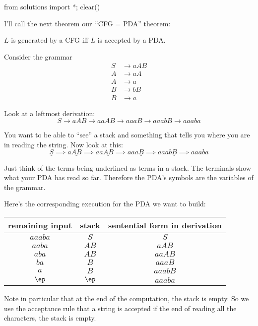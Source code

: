 \begin{python0}
from solutions import *; clear()
\end{python0}

I'll call the next theorem our \lq\lq CFG = PDA'' theorem:
\begin{thm}
 $L$ is generated by a CFG iff $L$ is accepted by a PDA.
\end{thm}

\begin{eg}
 Consider the grammar
 \begin{align*}
  S &\rightarrow aAB \\
  A &\rightarrow aA \\
  A &\rightarrow a \\
  B &\rightarrow bB \\
  B &\rightarrow a
 \end{align*}
\end{eg}

Look at a leftmost derivation:
\[
 S \rightarrow aAB \rightarrow aaAB \rightarrow aaaB \rightarrow
 aaabB \rightarrow aaaba
\]

You want to be able to ``see'' a stack and something that tells
you where you are in reading the string. Now look at this:
\[
\underline{S} 
\implies a\underline{AB} 
\implies aa\underline{AB} 
\implies aaa\underline{B} 
\implies aaab\underline{B}
\implies aaaba
\]

Just think of the terms being underlined as terms in a stack.
The terminals show what your PDA has read so far.
Therefore the PDA's symbols are the variables of the grammar.

Here's the corresponding execution for the PDA we want to build:
\begin{center}
\begin{tabular}{|c|c|c|} \hline
remaining input & stack & sentential form in derivation \\ \hline
$aaaba$ & $S$  & $S$ \\
$aaba$  & $AB$ & $aAB$ \\
$aba$   & $AB$ & $aaAB$ \\
$ba$    & $B$ & $aaaB$ \\
$a$     & $B$ & $aaabB$ \\
$\ep$   & $\ep$ & $aaaba$ \\ \hline
\end{tabular}
\end{center}

Note in particular that at the end of the computation, the stack is empty.
So we use the acceptance rule that a string is accepted if the end of reading 
all the characters, the stack is empty.

